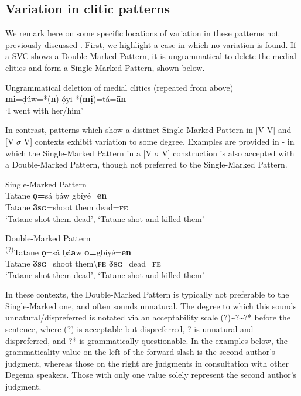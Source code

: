 \documentclass[output=paper]{langsci/langscibook}
\begin{document}
\subsection{Variation in clitic patterns}
\label{sec:4.2}
We remark here on some specific locations of variation in these patterns not previously discussed \citep{Kari1997,Kari2003a,Kari2003b,Kari2004}. First, we highlight a case in which no variation is found. If a SVC shows a Double-Marked Pattern, it is ungrammatical to delete the medial clitics and form a Single-Marked Pattern, shown below.

\ea
{Ungrammatical deletion of medial clitics (repeated from  above)}\\
\textbf{mi}=ḍúw=*(\textbf{n})   ọ́yi   *(\textbf{mị})=tá=\textbf{ān}\\
\glt ‘I went with her/him’ \citep[201]{Kari2004}
\z

In contrast, patterns which show a distinct Single-Marked Pattern in [V V] and [V $\sigma $ V] contexts exhibit variation to some degree. Examples are provided in - in which the Single-Marked Pattern in a [V $\sigma $ V] construction is also accepted with a Double-Marked Pattern, though not preferred to the Single-Marked Pattern.

\ea\label{ex:rolle:21}
Single-Marked Pattern\\
\gll    Tatane  \textbf{ọ=}sá    ḅáw   gbíyé=\textbf{ēn}\\
     Tatane  \textbf{3}\textbf{\textsc{sg}}=shoot  them   dead=\textbf{\textsc{fe}}\\
\glt ‘Tatane shot them dead’, ‘Tatane shot and killed them’ 
\z

\ea\label{ex:rolle:22}
 Double-Marked Pattern\\
\gll  \textsuperscript{(?)}Tatane  \textbf{ọ}=sá    ḅá\textbf{ā}w    \textbf{o=}gbíyé=\textbf{ēn}\\
     Tatane  \textbf{3\textsc{sg}}=shoot   them{\textbackslash}\textbf{\textsc{fe}}    \textbf{3\textsc{sg}}=dead=\textbf{\textsc{fe}}\\
\glt ‘Tatane shot them dead’, ‘Tatane shot and killed them’
\z

In these contexts, the Double-Marked Pattern is typically not preferable to the Single-Marked one, and often sounds unnatural. The degree to which this sounds unnatural/dispreferred is notated via an acceptability scale (?){\textasciitilde}?{\textasciitilde}?* before the sentence, where (?) is acceptable but dispreferred, ? is unnatural and dispreferred, and ?* is grammatically questionable. In the examples below, the grammaticality value on the left of the forward slash is the second author’s judgment, whereas those on the right are judgments in consultation with other Degema speakers. Those with only one value solely represent the second author’s judgment.
\end{document}
